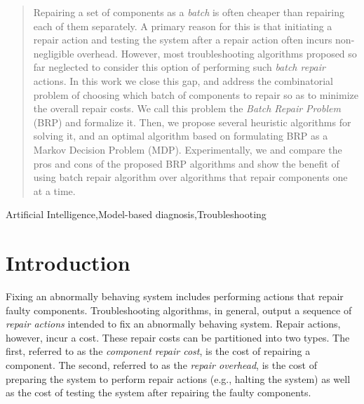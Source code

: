 \documentclass[review]{elsarticle}
\begin{document}
\begin{frontmatter}
\begin{abstract}
Repairing a set of components as a \emph{batch} is often cheaper than repairing each of them separately. A primary reason for this is that initiating a repair action and testing the system after a repair action often incurs non-negligible overhead. 
However, most troubleshooting algorithms proposed so far neglected to consider 
this option of performing such \emph{batch repair} actions. 
In this work we close this gap, and address the combinatorial problem of choosing which batch of components to repair so as to minimize the overall repair costs. We call this problem the \emph{Batch Repair Problem} (BRP) and formalize it. Then, we propose several heuristic algorithms for solving it, and an optimal algorithm based on formulating BRP as a Markov Decision Problem (MDP). Experimentally, we and compare the pros and cons of the proposed BRP algorithms and show the benefit of using batch repair algorithm over algorithms that repair components one at a time. 
\end{abstract}

\begin{keyword}
Artificial Intelligence\sep Model-based diagnosis\sep Troubleshooting
\end{keyword}

\end{frontmatter}

\linenumbers



\section{Introduction}
\label{sec:introduction}
Fixing an abnormally behaving system includes performing actions that repair faulty components. Troubleshooting algorithms, in general, output a sequence of \emph{repair actions} intended to fix an abnormally behaving system. 
Repair actions, however, incur a cost. These repair costs can be partitioned into two types.  The first, referred to as the {\em component repair cost}, is the cost of repairing a component. The second, referred to as the {\em repair overhead}, is the cost of preparing the system to perform repair actions (e.g., halting the system) as well as the cost of testing the system after repairing the faulty components.
\end{document}
